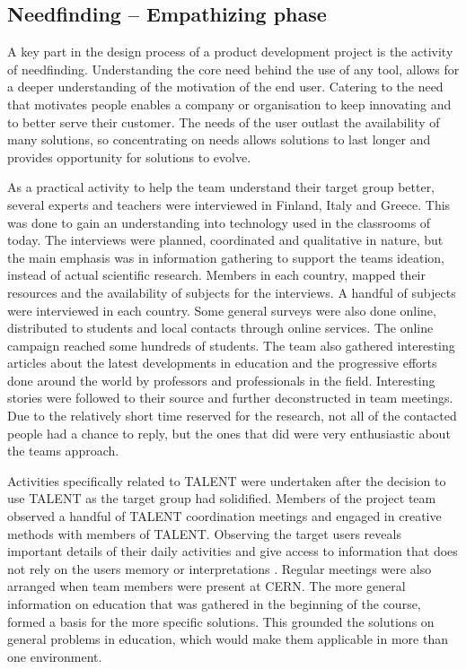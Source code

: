 \documentclass[english,12pt,a4paper,pdftex]{article}
\begin{document}

\subsection{Needfinding -- Empathizing phase}

A key part in the design process of a product development project is the activity of needfinding. Understanding the core need behind the use of any tool, allows for a deeper understanding of the motivation of the end user. Catering to the need that motivates people enables a company or organisation to keep innovating and to better serve their customer. The needs of the user outlast the availability of many solutions, so concentrating on needs allows solutions to last longer and provides opportunity for solutions to evolve. \cite{Patnaik} 

As a practical activity to help the team understand their target group better, several experts and teachers were interviewed in Finland, Italy and Greece. This was done to gain an understanding into technology used in the classrooms of today. The interviews were planned, coordinated and qualitative in nature, but the main emphasis was in information gathering to support the teams ideation, instead of actual scientific research. Members in each country, mapped their resources and the availability of subjects for the interviews. A handful of subjects were interviewed in each country. Some general surveys were also done online, distributed to students and local contacts through online services. The online campaign reached some hundreds of students. The team also gathered interesting articles about the latest developments in education and the progressive efforts done around the world by professors and professionals in the field. Interesting stories were followed to their source and further deconstructed in team meetings. Due to the relatively short time reserved for the research, not all of the contacted people had a chance to reply, but the ones that did were very enthusiastic about the teams approach. 

Activities specifically related to TALENT were undertaken after the decision to use TALENT as the target group had solidified. Members of the project team observed a handful of TALENT coordination meetings and engaged in creative methods with members of TALENT. Observing the target users reveals important details of their daily activities and give access to information that does not rely on the users memory or interpretations \cite{Patnaik}. Regular meetings were also arranged when team members were present at CERN. The more general information on education that was gathered in the beginning of the course, formed a basis for the more specific solutions. This grounded the solutions on general problems in education, which would make them applicable in more than one environment.
\end{document}
